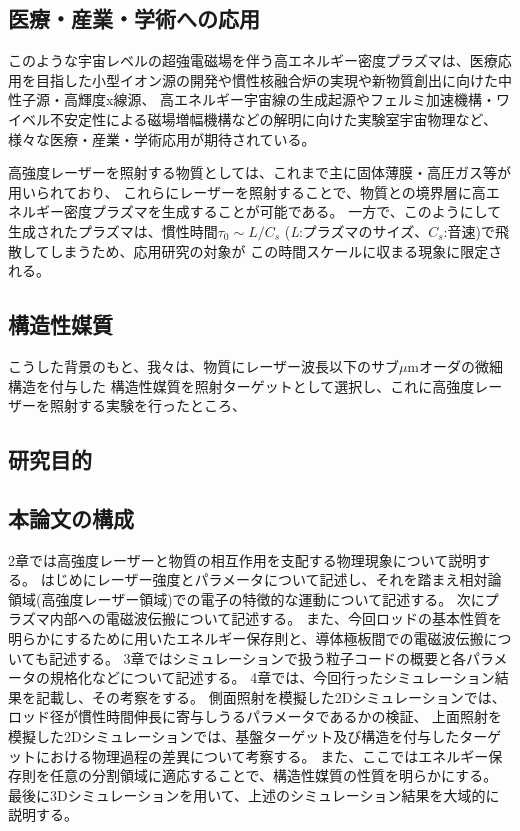 \documentclass[a4paper,11pt,titlepage]{jsarticle}
\begin{document}
  \subsection{医療・産業・学術への応用}
  このような宇宙レベルの超強電磁場を伴う高エネルギー密度プラズマは、医療応用を目指した小型イオン源の開発や慣性核融合炉の実現や新物質創出に向けた中性子源・高輝度x線源、
  高エネルギー宇宙線の生成起源やフェルミ加速機構・ワイベル不安定性による磁場増幅機構などの解明に向けた実験室宇宙物理など、
  様々な医療・産業・学術応用が期待されている。
  \par
  
  
  

  高強度レーザーを照射する物質としては、これまで主に固体薄膜・高圧ガス等が用いられており、
  これらにレーザーを照射することで、物質との境界層に高エネルギー密度プラズマを生成することが可能である。
  一方で、このようにして生成されたプラズマは、慣性時間$\tau_0 \sim L/C_s$
  (\textit{L}:プラズマのサイズ、$C_s$:音速)で飛散してしまうため、応用研究の対象が
  この時間スケールに収まる現象に限定される。

  \subsection{構造性媒質}

  こうした背景のもと、我々は、物質にレーザー波長以下のサブ$\mu$mオーダの微細構造を付与した
  構造性媒質を照射ターゲットとして選択し、これに高強度レーザーを照射する実験を行ったところ、
  
  \subsection{研究目的}

  \subsection{本論文の構成}

  2章では高強度レーザーと物質の相互作用を支配する物理現象について説明する。
  はじめにレーザー強度とパラメータについて記述し、それを踏まえ相対論領域(高強度レーザー領域)での電子の特徴的な運動について記述する。
  次にプラズマ内部への電磁波伝搬について記述する。
  また、今回ロッドの基本性質を明らかにするために用いたエネルギー保存則と、導体極板間での電磁波伝搬についても記述する。
  3章ではシミュレーションで扱う粒子コードの概要と各パラメータの規格化などについて記述する。
  4章では、今回行ったシミュレーション結果を記載し、その考察をする。
  側面照射を模擬した2Dシミュレーションでは、ロッド径が慣性時間伸長に寄与しうるパラメータであるかの検証、
  上面照射を模擬した2Dシミュレーションでは、基盤ターゲット及び構造を付与したターゲットにおける物理過程の差異について考察する。
  また、ここではエネルギー保存則を任意の分割領域に適応することで、構造性媒質の性質を明らかにする。
  最後に3Dシミュレーションを用いて、上述のシミュレーション結果を大域的に説明する。
\end{document}
